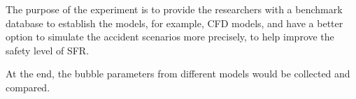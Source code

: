 \documentclass[11pt]{article}
\begin{document}
The purpose of the experiment is to provide the researchers with a benchmark database to establish the models, for example, CFD models, and have a better option to simulate the accident scenarios more precisely, to help improve the safety level of SFR.

At the end, the bubble parameters from different models would be collected and compared.
\end{document}
